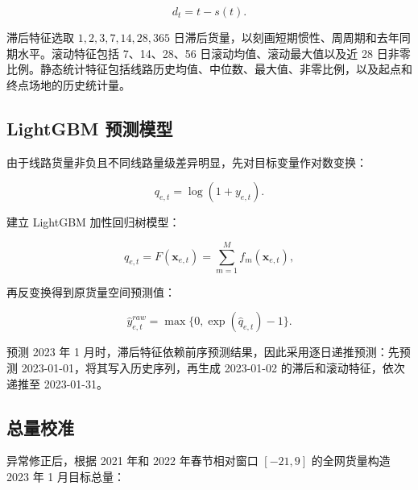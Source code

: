 \documentclass[UTF8,zihao=-4,a4paper,fontset=fandol]{ctexart}
\begin{document}
\begin{equation}
d_t=t-s(t).
\end{equation}



滞后特征选取 $1,2,3,7,14,28,365$ 日滞后货量，以刻画短期惯性、周周期和去年同期水平。滚动特征包括 7、14、28、56 日滚动均值、滚动最大值以及近 28 日非零比例。静态统计特征包括线路历史均值、中位数、最大值、非零比例，以及起点和终点场地的历史统计量。



\subsection{LightGBM 预测模型}



由于线路货量非负且不同线路量级差异明显，先对目标变量作对数变换：



\begin{equation}
q_{e,t}=\log(1+y_{e,t}).
\end{equation}



建立 LightGBM 加性回归树模型：



\begin{equation}
\hat q_{e,t}=F(\mathbf{x}_{e,t})=\sum_{m=1}^{M} f_m(\mathbf{x}_{e,t}),
\end{equation}



再反变换得到原货量空间预测值：



\begin{equation}
\hat y^{raw}_{e,t}=\max\{0,\exp(\hat q_{e,t})-1\}.
\end{equation}



预测 2023 年 1 月时，滞后特征依赖前序预测结果，因此采用逐日递推预测：先预测 2023-01-01，将其写入历史序列，再生成 2023-01-02 的滞后和滚动特征，依次递推至 2023-01-31。



\subsection{总量校准}



异常修正后，根据 2021 年和 2022 年春节相对窗口 $[-21,9]$ 的全网货量构造 2023 年 1 月目标总量：
\end{document}
